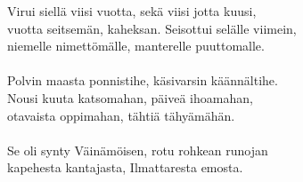 Virui siellä viisi vuotta, sekä viisi jotta kuusi,          \\
vuotta seitsemän, kaheksan. Seisottui selälle viimein,      \\
niemelle nimettömälle, manterelle puuttomalle.              \\
                                                            \\
Polvin maasta ponnistihe, käsivarsin käännältihe.           \\
Nousi kuuta katsomahan, päiveä ihoamahan,                   \\
otavaista oppimahan, tähtiä tähyämähän.                     \\
                                                            \\
Se oli synty Väinämöisen, rotu rohkean runojan              \\
kapehesta kantajasta, Ilmattaresta emosta.					\\
%